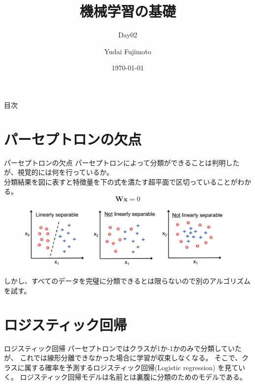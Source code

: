 \documentclass[aspectratio=169, dvipdfmx, 11pt]{beamer} %
\title[Day02]{機械学習の基礎}
\subtitle{Day02}
\author[Yudai Fujimoto]{Yudai Fujimoto}
\institute[SUS]{Suwa University of Science}
\date{\today}
\begin{document}
\maketitle

\begin{frame}{目次}
    \tableofcontents
\end{frame}

\section{パーセプトロンの欠点}
\begin{frame}{パーセプトロンの欠点}
    パーセプトロンによって分類ができることは判明したが、視覚的には何を行っているか。 \\
    分類結果を図に表すと特徴量を下の式を満たす超平面で区切っていることがわかる。 \\
    \begin{equation*}
        \textbf{W} \textbf{x} = 0
    \end{equation*}
    \begin{figure}[b]
        \begin{center}
        \includegraphics[width=120mm]{img/day02/fig01.png}
        \end{center}
    \end{figure}
    しかし、すべてのデータを完璧に分類できるとは限らないので別のアルゴリズムを試す。
\end{frame}

\section{ロジスティック回帰}
\begin{frame}{ロジスティック回帰}
    パーセプトロンではクラスが1か-1かのみで分類していたが、
    これでは線形分離できなかった場合に学習が収束しなくなる。
    そこで、クラスに属する確率を予測するロジスティック回帰(Logistic regression)
    を見ていく。
    ロジスティック回帰モデルは名前とは裏腹に分類のためのモデルである。
\end{frame} 
\end{document}
